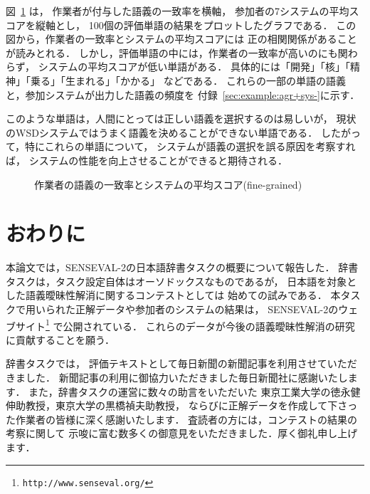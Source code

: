図~\ref{fig:annotator-system} は，
作業者が付与した語義の一致率を横軸，
参加者の7システムの平均スコアを縦軸とし，
100個の評価単語の結果をプロットしたグラフである．
この図から，作業者の一致率とシステムの平均スコアには
正の相関関係があることが読みとれる．
しかし，評価単語の中には，作業者の一致率が高いのにも関わらず，
システムの平均スコアが低い単語がある．
具体的には「開発」「核」「精神」「乗る」「生まれる」「かかる」
などである．
これらの一部の単語の語義と，参加システムが出力した語義の頻度を
付録~\ref{sec:example:agr+sys-}に示す．

このような単語は，人間にとっては正しい語義を選択するのは易しいが，
現状のWSDシステムではうまく語義を決めることができない単語である．
したがって，特にこれらの単語について，
システムが語義の選択を誤る原因を考察すれば，
システムの性能を向上させることができると期待される．

\begin{figure}[tbp]
  \begin{center}
  
    \caption{作業者の語義の一致率とシステムの平均スコア(fine-grained)}
    \label{fig:annotator-system}
  \end{center}
\end{figure}

\section{おわりに}
\label{sec:conclusion}

本論文では，SENSEVAL-2の日本語辞書タスクの概要について報告した．
辞書タスクは，タスク設定自体はオーソドックスなものであるが，
日本語を対象とした語義曖昧性解消に関するコンテストとしては
始めての試みである．
本タスクで用いられた正解データや参加者のシステムの結果は，
SENSEVAL-2のウェブサイト\footnote{
  {\tt http://www.senseval.org/}}
で公開されている．
これらのデータが今後の語義曖昧性解消の研究に貢献することを願う．

\bigskip
\acknowledgment

辞書タスクでは，
評価テキストとして毎日新聞の新聞記事を利用させていただきました．
新聞記事の利用に御協力いただきました毎日新聞社に感謝いたします．
また，辞書タスクの運営に数々の助言をいただいた
東京工業大学の徳永健伸助教授，東京大学の黒橋禎夫助教授，
ならびに正解データを作成して下さった作業者の皆様に深く感謝いたします．
査読者の方には，コンテストの結果の考察に関して
示唆に富む数多くの御意見をいただきました．厚く御礼申し上げます．





